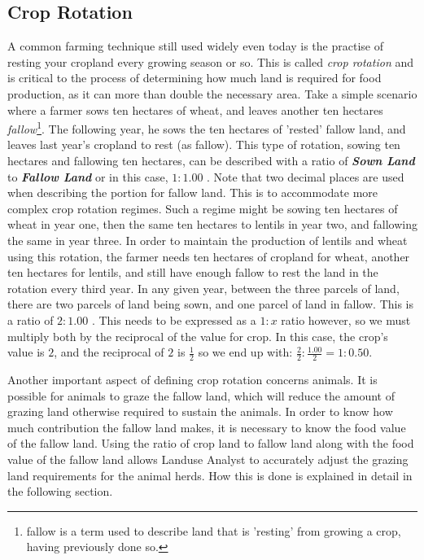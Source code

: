     \subsection{Crop Rotation}
    \label{cropRotation}
    A common farming technique still used widely even today is the practise of
resting your cropland every growing season or so.  This is called \textit{crop
rotation} and is critical to the process of determining how much land is
required for food production, as it can more than double the necessary area. 
Take a simple scenario where a farmer sows ten hectares of wheat, and leaves
another ten hectares \textit{fallow}\footnote{fallow is a term used to describe
land that is 'resting' from growing a crop, having previously done so.}.  The
following year, he sows the ten hectares of 'rested' fallow land, and leaves
last year's cropland to rest (as fallow).  This type of rotation, sowing ten
hectares and fallowing ten hectares, can be described with a ratio of
\textbf{\textit{Sown Land}} to \textbf{\textit{Fallow Land}} or in this case,
$1:1.00$ .  Note that two decimal places are used when describing the portion
for fallow land.  This is to accommodate more complex crop rotation regimes. 
Such a regime might be sowing ten hectares of wheat in year one, then the same
ten hectares to lentils in year two, and fallowing the same in year three.  In
order to maintain the production of lentils and wheat using this rotation, the
farmer needs ten hectares of cropland for wheat, another ten hectares for
lentils, and still have enough fallow to rest the land in the rotation every
third year.  In any given year, between the three parcels of land, there are two
parcels of land being sown, and one parcel of land in fallow.  This is a ratio
of $2:1.00$ .  This needs to be expressed as a $1:x$ ratio however, so we must
multiply both by the reciprocal of the value for crop.  In this case, the crop's
value is $2$, and the reciprocal of $2$ is $\frac{1}{2}$ so we end up with:
$\frac{2}{2}:\frac{1.00}{2} = 1:0.50$.

    Another important aspect of defining crop rotation concerns animals.  It is
possible for animals to graze the fallow land, which will reduce the amount of
grazing land otherwise required to sustain the animals.  In order to know how
much contribution the fallow land makes, it is necessary to know the food value
of the fallow land.  Using the ratio of crop land to fallow land along with the food
value of the fallow land allows Landuse Analyst to accurately adjust the grazing
land requirements for the animal herds.  How this is done is explained in detail
in the following section.

